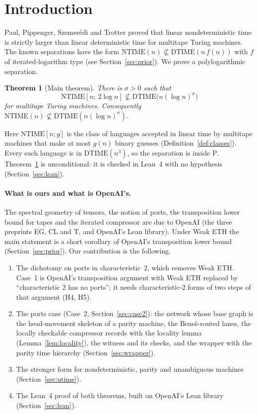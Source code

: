 \documentclass[11pt]{article}
\newtheorem{theorem}{Theorem}[section]
\theoremstyle{definition}
\theoremstyle{remark}
\newcommand{\DTIME}{\mathrm{DTIME}}
\newcommand{\NTIME}{\mathrm{NTIME}}
\begin{document}
\tableofcontents

\section{Introduction}\label{sec:intro}

Paul, Pippenger, Szemer\'edi and Trotter proved that linear nondeterministic time is strictly larger than linear
deterministic time for multitape Turing machines. The known separations have the form $\NTIME(n)\not\subseteq\DTIME(n\,f(n))$
with $f$ of iterated-logarithm type (see Section~\ref{sec:prior}). We prove a polylogarithmic separation.

\begin{theorem}[Main theorem]\label{thm:main}
There is $\sigma>0$ such that
\[
  \NTIME[n;\,2\log n]\not\subseteq\DTIME\bigl(n(\log n)^{\sigma}\bigr)
\]
for multitape Turing machines. Consequently $\NTIME(n)\not\subseteq\DTIME(n(\log n)^{\sigma})$.
\end{theorem}

Here $\NTIME[n;g]$ is the class of languages accepted in linear time by multitape machines that make at most $g(n)$ binary
guesses (Definition~\ref{def:classes}). Every such language is in $\DTIME(n^{3})$, so the separation is inside $\mathrm P$.
Theorem~\ref{thm:main} is unconditional: it is checked in Lean~4 with no hypothesis (Section~\ref{sec:lean}).

\paragraph{What is ours and what is OpenAI's.} The spectral geometry of tensors, the notion of ports, the transposition lower
bound for tapes and the iterated compressor are due to OpenAI (the three preprints EG, CL and T, and OpenAI's Lean library).
Under Weak ETH the main statement is a short corollary of OpenAI's transposition lower bound (Section~\ref{sec:prior}). Our
contribution is the following.
\begin{enumerate}
\item[(i)] The dichotomy on ports in characteristic~$2$, which removes Weak ETH. Case~1 is OpenAI's transposition argument with
Weak ETH replaced by ``characteristic $2$ has no ports''; it needs characteristic-$2$ forms of two steps of that argument (H4, H5).
\item[(ii)] The ports case (Case~2, Section~\ref{sec:case2}): the network whose base graph is the head-movement skeleton of a
parity machine, the Bene\v{s}-routed lanes, the locally checkable compressor records with the locality lemma
(Lemma~\ref{lem:locality}), the witness and its checks, and the wrapper with the parity time hierarchy (Section~\ref{sec:wrapper}).
\item[(iii)] The stronger form for nondeterministic, parity and unambiguous machines (Section~\ref{sec:utime}).
\item[(iv)] The Lean~4 proof of both theorems, built on OpenAI's Lean library (Section~\ref{sec:lean}).
\end{enumerate}
\end{document}
